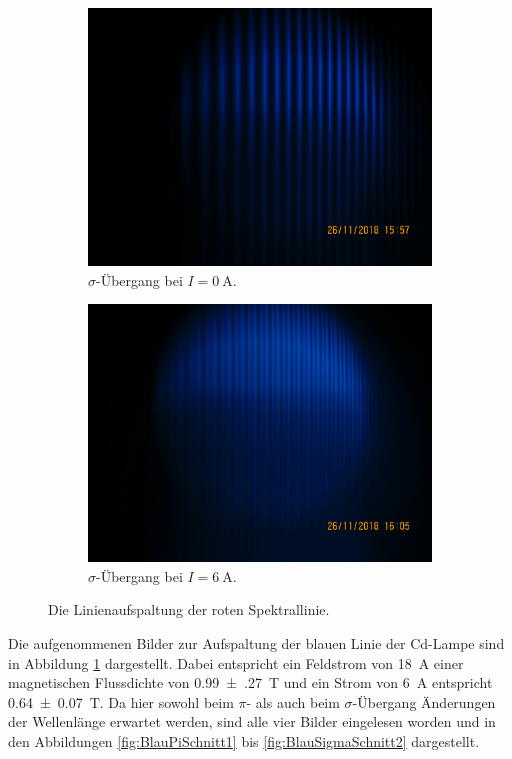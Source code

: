 \begin{figure}
\begin{subfigure}{.49\textwidth}
    \includegraphics[width=\textwidth]{rohdaten/blau_sigma_0A.JPG}
    \caption{$\sigma$-Übergang bei $I = \SI{0}{\ampere}.$}
  \end{subfigure}
  \begin{subfigure}{.49\textwidth}
    \centering
    \includegraphics[width=\textwidth]{rohdaten/blau_sigma_6A.JPG}
    \caption{$\sigma$-Übergang bei $I = \SI{6}{\ampere}.$}
  \end{subfigure}
  \caption{Die Linienaufspaltung der roten Spektrallinie.}
  \label{fig:AuswBlau}
\end{figure}

Die aufgenommenen Bilder zur Aufspaltung der blauen Linie der Cd-Lampe
sind in Abbildung \ref{fig:AuswBlau} dargestellt.
Dabei entspricht ein Feldstrom von \SI{18}{\ampere} einer magnetischen
Flussdichte von \SI{0.99(27)}{\tesla} und ein Strom von
\SI{6}{\ampere} entspricht \SI{0.64(7)}{\tesla}.
Da hier sowohl beim $\pi$- als auch beim $\sigma$-Übergang Änderungen
der Wellenlänge erwartet werden, sind alle vier Bilder eingelesen worden
und in den Abbildungen \ref{fig:BlauPiSchnitt1} bis \ref{fig:BlauSigmaSchnitt2}
dargestellt.

